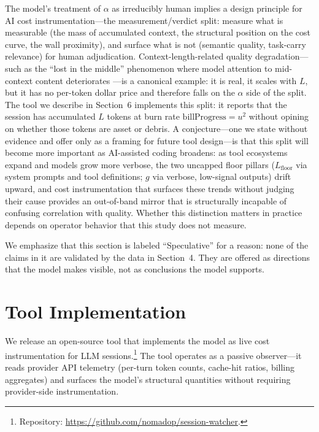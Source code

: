 \documentclass[11pt]{article}
\theoremstyle{definition}
\theoremstyle{remark}
\begin{document}
The model's treatment of $\alpha$ as irreducibly human implies a design principle for AI cost instrumentation---the measurement/verdict split: measure what is measurable (the mass of accumulated context, the structural position on the cost curve, the wall proximity), and surface what is not (semantic quality, task-carry relevance) for human adjudication. Context-length-related quality degradation---such as the ``lost in the middle'' phenomenon where model attention to mid-context content deteriorates \citep{liu2023}---is a canonical example: it is real, it scales with $L$, but it has no per-token dollar price and therefore falls on the $\alpha$ side of the split. The tool we describe in Section~6 implements this split: it reports that the session has accumulated $L$ tokens at burn rate $\text{billProgress} = u^2$ without opining on whether those tokens are asset or debris. A conjecture---one we state without evidence and offer only as a framing for future tool design---is that this split will become more important as AI-assisted coding broadens: as tool ecosystems expand and models grow more verbose, the two uncapped floor pillars ($L_{\text{floor}}$ via system prompts and tool definitions; $g$ via verbose, low-signal outputs) drift upward, and cost instrumentation that surfaces these trends without judging their cause provides an out-of-band mirror that is structurally incapable of confusing correlation with quality. Whether this distinction matters in practice depends on operator behavior that this study does not measure.

We emphasize that this section is labeled ``Speculative'' for a reason: none of the claims in it are validated by the data in Section~4. They are offered as directions that the model makes visible, not as conclusions the model supports.

\section{Tool Implementation}

We release an open-source tool that implements the model as live cost instrumentation for LLM sessions.\footnote{Repository: \url{https://github.com/nomadop/session-watcher}.} The tool operates as a passive observer---it reads provider API telemetry (per-turn token counts, cache-hit ratios, billing aggregates) and surfaces the model's structural quantities without requiring provider-side instrumentation.
\end{document}
